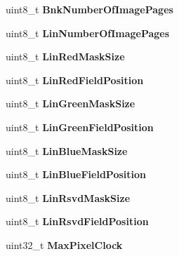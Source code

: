 \begin{DoxyCompactItemize}
\item 
\hypertarget{group__vbe_ga33ba903e149724b1bc99b3b8e43a7cbe}{}uint8\+\_\+t {\bfseries Bnk\+Number\+Of\+Image\+Pages}\label{group__vbe_ga33ba903e149724b1bc99b3b8e43a7cbe}

\item 
\hypertarget{group__vbe_ga3fa2352e69836f4b69b3a344ae761ba8}{}uint8\+\_\+t {\bfseries Lin\+Number\+Of\+Image\+Pages}\label{group__vbe_ga3fa2352e69836f4b69b3a344ae761ba8}

\item 
\hypertarget{group__vbe_ga1fbcef2402fe6ce7f6c006bd50eaa6da}{}uint8\+\_\+t {\bfseries Lin\+Red\+Mask\+Size}\label{group__vbe_ga1fbcef2402fe6ce7f6c006bd50eaa6da}

\item 
\hypertarget{group__vbe_gaff962b58f86a77f12b412d47125a4993}{}uint8\+\_\+t {\bfseries Lin\+Red\+Field\+Position}\label{group__vbe_gaff962b58f86a77f12b412d47125a4993}

\item 
\hypertarget{group__vbe_gaf235e505028771ab2fb84778f4dfb476}{}uint8\+\_\+t {\bfseries Lin\+Green\+Mask\+Size}\label{group__vbe_gaf235e505028771ab2fb84778f4dfb476}

\item 
\hypertarget{group__vbe_ga6683a63711dbc5dfb9a2a59c55deecd5}{}uint8\+\_\+t {\bfseries Lin\+Green\+Field\+Position}\label{group__vbe_ga6683a63711dbc5dfb9a2a59c55deecd5}

\item 
\hypertarget{group__vbe_gad8a25cec803bf91fb40a20a0aa5d5bf7}{}uint8\+\_\+t {\bfseries Lin\+Blue\+Mask\+Size}\label{group__vbe_gad8a25cec803bf91fb40a20a0aa5d5bf7}

\item 
\hypertarget{group__vbe_ga3f38d6becbe961786cd7ab58ec37fc07}{}uint8\+\_\+t {\bfseries Lin\+Blue\+Field\+Position}\label{group__vbe_ga3f38d6becbe961786cd7ab58ec37fc07}

\item 
\hypertarget{group__vbe_ga334886fc9a915ff91966c3aac1da586a}{}uint8\+\_\+t {\bfseries Lin\+Rsvd\+Mask\+Size}\label{group__vbe_ga334886fc9a915ff91966c3aac1da586a}

\item 
\hypertarget{group__vbe_ga3df070e698b5f54814e20c8813f7bf7e}{}uint8\+\_\+t {\bfseries Lin\+Rsvd\+Field\+Position}\label{group__vbe_ga3df070e698b5f54814e20c8813f7bf7e}

\item 
\hypertarget{group__vbe_gab1fbd72846963ebb34a308a7edf7bbe1}{}uint32\+\_\+t {\bfseries Max\+Pixel\+Clock}\label{group__vbe_gab1fbd72846963ebb34a308a7edf7bbe1}


\end{DoxyCompactItemize}
